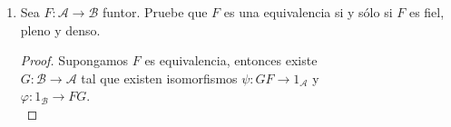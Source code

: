 \documentclass{article}
\begin{document}
\begin{enumerate}[label=\textbf{Ej \arabic*.}]
\begin{proof}
\begin{align*}
	 	\end{align*}
 		de modo que el siguiente diagrama conmuta
 		\begin{equation*}
 			\commutativesquare{A=F\lrprth{A},B=H\lrprth{A},C=F\lrprth{A'},D=H\lrprth{A'},f=\rho_{A}\eta_{A},g=F\lrprth{\alpha},h=G\lrprth{\alpha},k=\rho_{A'}\eta_{A'},},
 		\end{equation*}
 		y por lo tanto $\catarrow{\rho\eta}{F}{H}{}$ es una tranformación natural.\\
 		Verificaremos ahora que la composición de transformaciones naturales es asociativa. Si $\rho$ y $\eta$ están dados como al comienzo, $I\in\lrsqp{\mathscr{A},\mathscr{B}}$ y $\catarrow{\chi}{H}{I}{}$  es una transformación natural, entonces si $A\in\mathscr{A}$
 		\begin{align*}
 			\chi_A\lrprth{\rho_{A}\eta_{A}}&=\lrprth{\chi_A\rho_{A}}\eta_{A}\in\lrprth{\chi\rho}\eta,\\
 			\implies & \chi\lrprth{\rho\eta}\subseteq\lrprth{\chi\rho}\eta.
 		\end{align*}
 		En forma análoga se verifica la otra contención, y así se tiene que $\chi\lrprth{\rho\eta}=\lrprth{\chi\rho}\eta$.\\
 		 Si $\catarrow{\alpha}{A}{A'}{}$ está en $\mathscr{A}$, entonces
 		\begin{align*}
 			T\lrprth{\alpha}1_{T\lrprth{A}}&=T\lrprth{\alpha}\\
 			&=1_{T\lrprth{A'}}T\lrprth{\alpha},
		\end{align*}
		luego\begin{equation*}
			\commutativesquare{A=T\lrprth{A},B=T\lrprth{A},C=T\lrprth{A'},D=T\lrprth{A'},f=1_{T\lrprth{A}},g=T\lrprth{\alpha},h=T\lrprth{\alpha},k=1_{T\lrprth{A'}},}
		\end{equation*}
		conmuta, y por tanto $\catarrow{1_T}{T}{T}{}$ es una transformación natural.\\
		 Se tiene que $\forall\ A\in\mathscr{A}$ $\alpha_A1_{F\lrprth{A}}=\eta_A$, con lo cual $\lrprth{\alpha 1_F}_A=\alpha_A$ y por tanto $\alpha 1_F=\alpha$. Análogamente se verifica que $1_G\alpha=\alpha$.
		\end{proof}

\item Sea $F\colon\mathscr{A}\longrightarrow\mathscr{B}$ funtor. Pruebe que $F$ es una equivalencia si y sólo si $F$ es fiel, pleno y denso.\\
\begin{proof}
\boxed{\Rightarrow} Supongamos $F$ es equivalencia, entonces existe \\ $G\colon\mathscr{B}\longrightarrow\mathscr{A}$ tal que existen isomorfismos
$\psi\colon GF\longrightarrow 1_{\mathscr{A}}$ y \\ $\varphi\colon 1_{\mathscr{B}}\longrightarrow FG$.\\


\end{proof}
\end{enumerate}
\end{document}
